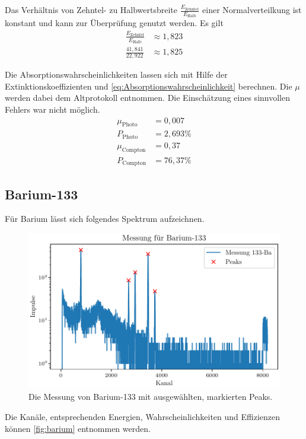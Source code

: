 Das Verhältnis von Zehntel- zu Halbwertsbreite $\frac{E_\text{Zehntel}}{E_\text{Halb}}$  einer Normalverteilkung ist konstant und kann zur Überprüfung genutzt werden. Es gilt
\begin{align}
        \frac{E_\text{Zehntel}}{E_\text{Halb}} &\approx  1,823 \\
        \frac{41,841}{22,922} &\approx 1,825
\end{align}

Die Absorptionswahrscheinlichkeiten lassen sich mit Hilfe der Extinktionskoeffizienten %
und \eqref{eq:Absorptionswahrscheinlichkeit} berechnen. Die $\mu$ werden dabei dem Altprotokoll \cite{Altprotokoll} entnommen. Die Einschätzung eines sinnvollen Fehlers war nicht möglich.
\begin{align}
    \mu_\text{Photo} &= 0,007 \\
    P_\text{Photo} &= 2,693 \% \\
    \mu_\text{Compton} &= 0,37 \\
    P_\text{Compton} &= 76,37 \%
\end{align}


\subsection{Barium-133}

Für Barium lässt sich folgendes Spektrum aufzeichnen.

\begin{figure}[H]
    \centering
    \includegraphics[width=\textwidth]{plots/Barium.pdf}
    \caption{Die Messung von Barium-133 mit ausgewählten, markierten Peaks.}
    \label{fig:barium}
\end{figure}

Die Kanäle, entsprechenden Energien, Wahrscheinlichkeiten und Effizienzen können \autoref{fig:barium} entnommen werden.

